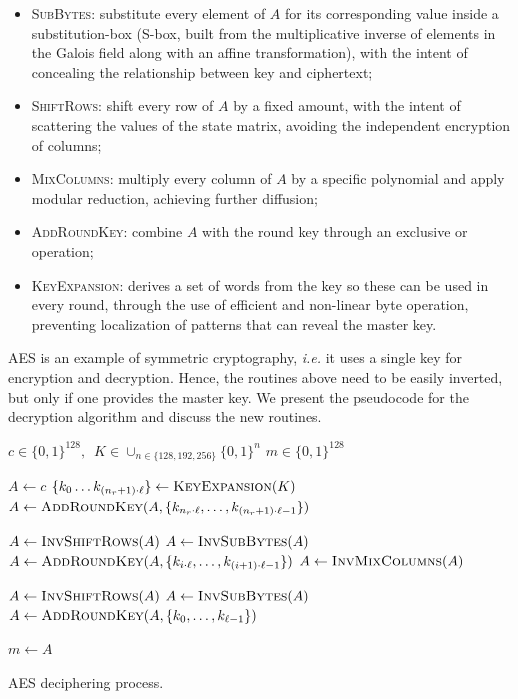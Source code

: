\documentclass{../sftex/sftex}
\newcommand{\binwds}[1]{\{0, 1\}^{#1}}
\begin{document}
\begin{itemize}
  \item \textsc{SubBytes}: substitute every element of $A$ for its
      corresponding value inside a substitution-box (S-box, built from the
        multiplicative inverse of elements in the Galois field along with an
        affine transformation), with the intent of concealing the relationship
        between key and ciphertext;
  \item \textsc{ShiftRows}: shift every row of $A$ by a fixed amount, with the
      intent of scattering the values of the state matrix, avoiding the
        independent encryption of columns;
  \item \textsc{MixColumns}: multiply every column of $A$ by a specific
      polynomial and apply modular reduction, achieving further diffusion;
  \item \textsc{AddRoundKey}: combine $A$ with the round key through an
      exclusive or operation;
  \item \textsc{KeyExpansion}: derives a set of words from the key so these can
      be used in every round, through the use of efficient and non-linear byte
        operation, preventing localization of patterns that can reveal the
        master key.
\end{itemize}

AES is an example of symmetric cryptography, \emph{i.e.} it uses a single key
for encryption and decryption. Hence, the routines above need to be easily
inverted, but only if one provides the master key. We present the pseudocode
for the decryption algorithm and discuss the new routines.

\begin{algorithm}
  \begin{algorithmic}
    \REQUIRE{}  $c \in \binwds{128}, \enspace
      K \in \cup_{n \in \{128, 192, 256\}} \binwds{n}$
    \ENSURE{}  $m \in \binwds{128}$ 

    \STATE{}  $A \leftarrow c$
    \STATE{}  $\{k_{0} \dots k_{(n_{r} + 1) \cdot \ell}\}
      \leftarrow \textsc{KeyExpansion}(K)$
    \STATE{}  $A \leftarrow \textsc{AddRoundKey}(A,
      \{k_{n_{r} \cdot \ell}, \dots, k_{(n_{r} + 1) \cdot \ell - 1}\})$

      \STATE{}  $A \leftarrow \textsc{InvShiftRows}(A)$
      \STATE{}  $A \leftarrow \textsc{InvSubBytes}(A)$
      \STATE{}  $A \leftarrow \textsc{AddRoundKey}(A,
        \{k_{i \cdot \ell}, \dots, k_{(i + 1) \cdot \ell - 1}\})$
      \STATE{}  $A \leftarrow \textsc{InvMixColumns}(A)$
    \ENDFOR{}

    \STATE{}  $A \leftarrow \textsc{InvShiftRows}(A)$
    \STATE{}  $A \leftarrow \textsc{InvSubBytes}(A)$
    \STATE{}  $A \leftarrow \textsc{AddRoundKey}(A,
      \{k_{0}, \dots, k_{\ell - 1}\})$

    \STATE{}  $m \leftarrow A$
  \end{algorithmic}
  \caption{AES deciphering process.}\label{alg:aesdecrypt}
\end{algorithm}
\end{document}
